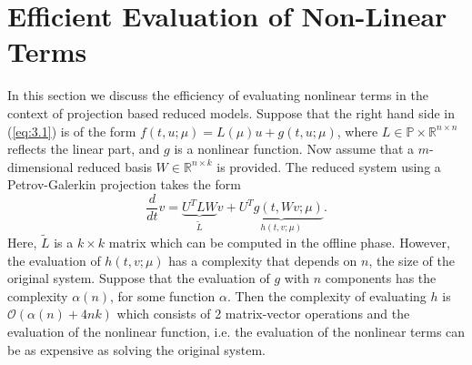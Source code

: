 \section{Efficient Evaluation of Non-Linear Terms} \label{sec:3.5}
In this section we discuss the efficiency of evaluating nonlinear terms in the context of projection based reduced models. Suppose that the right hand side in (\ref{eq:3.1}) is of the form $f(t, u ; \mu) = L(\mu) u + g(t,u ; \mu)$, where $L\in \mathbb P \times \mathbb R^{n\times n}$ reflects the linear part, and $g$ is a nonlinear function. Now assume that a $m$-dimensional reduced basis $W \in \mathbb R^{n\times k}$ is provided. The reduced system using a Petrov-Galerkin projection takes the form
\begin{equation} \label{eq:3.29}
	\frac{d}{dt} v= \underbrace{ U^T L W}_{\tilde L} v + \underbrace{ U^T g(t,Wv;\mu)}_{ h (t,v;\mu)}.
\end{equation}
Here, $\tilde L$ is a $k\times k$ matrix which can be computed in the offline phase. However, the evaluation of $ h (t,v;\mu)$ has a complexity that depends on $n$, the size of the original system. Suppose that the evaluation of $g$ with $n$ components has the complexity $\alpha(n)$, for some function $\alpha$. Then the complexity of evaluating $h$ is $\mathcal{O}(\alpha(n) + 4nk)$ which consists of 2 matrix-vector operations and the evaluation of the nonlinear function, i.e. the evaluation of the nonlinear terms can be as expensive as solving the original system.

